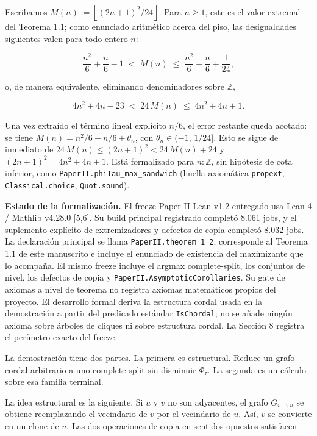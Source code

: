 \documentclass[
  spanish,
  11pt,
  a4paper,
]{article}
\begin{document}
Escribamos \(M(n):=\left\lfloor(2n+1)^2/24\right\rfloor\). Para \(n\ge1\), este es el valor extremal del Teorema 1.1; como enunciado aritmético acerca del piso, las desigualdades siguientes valen para todo entero \(n\):

\[
\frac{n^2}{6}+\frac{n}{6}-1
\;<\;
M(n)
\;\le\;
\frac{n^2}{6}+\frac{n}{6}+\frac{1}{24},
\]

o, de manera equivalente, eliminando denominadores sobre \(\mathbb Z\),

\[
4n^2+4n-23 \;<\; 24\,M(n) \;\le\; 4n^2+4n+1.
\]

Una vez extraído el término lineal explícito \(n/6\), el error restante queda acotado: se tiene \(M(n)=n^2/6+n/6+\theta_n\), con \(\theta_n\in(-1,\,1/24]\). Esto se sigue de inmediato de \(24\,M(n)\le(2n+1)^2<24\,M(n)+24\) y \((2n+1)^2=4n^2+4n+1\). Está formalizado para \(n:\mathbb Z\), sin hipótesis de cota inferior, como \texttt{PaperII.phiTau\_max\_sandwich} (huella axiomática \texttt{propext}, \texttt{Classical.choice}, \texttt{Quot.sound}).

\textbf{Estado de la formalización.} El freeze Paper II Lean v1.2 entregado usa Lean 4 / Mathlib v4.28.0 {[}5,6{]}. Su build principal registrado completó 8.061 jobs, y el suplemento explícito de extremizadores y defectos de copia completó 8.032 jobs. La declaración principal se llama \texttt{PaperII.theorem\_1\_2}; corresponde al Teorema 1.1 de este manuscrito e incluye el enunciado de existencia del maximizante que lo acompaña. El mismo freeze incluye el argmax complete-split, los conjuntos de nivel, los defectos de copia y \texttt{PaperII.AsymptoticCorollaries}. Su gate de axiomas a nivel de teorema no registra axiomas matemáticos propios del proyecto. El desarrollo formal deriva la estructura cordal usada en la demostración a partir del predicado estándar \texttt{IsChordal}; no se añade ningún axioma sobre árboles de cliques ni sobre estructura cordal. La Sección 8 registra el perímetro exacto del freeze.

La demostración tiene dos partes. La primera es estructural. Reduce un grafo cordal arbitrario a uno complete-split sin disminuir \(\Phi_\tau\). La segunda es un cálculo sobre esa familia terminal.

La idea estructural es la siguiente. Si \(u\) y \(v\) no son adyacentes, el grafo \(G_{v\to u}\) se obtiene reemplazando el vecindario de \(v\) por el vecindario de \(u\). Así, \(v\) se convierte en un clone de \(u\). Las dos operaciones de copia en sentidos opuestos satisfacen
\end{document}
